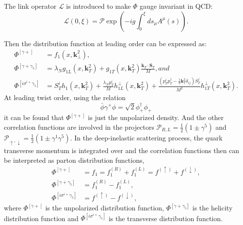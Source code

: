 The link operator $\mathcal{L}$ is introduced to make $\Phi$ gauge invariant in QCD:
\begin{equation}
\mathcal{L}(0,\xi)=\mathcal{P}\exp(-ig\int^{\xi}_0ds_\mu A^\mu(s)).
\end{equation}

Then the distribution function at leading order can be expressed as:
\begin{equation}
\begin{aligned}
       \Phi^{[\gamma+]}&=f_1(x,\boldsymbol{k}^2_{\perp}), \\
       \Phi^{[\gamma+\gamma_5]}&=\lambda_Ng_{1L}(x,\boldsymbol{k}_T^2)+ g_{1T}(x,\boldsymbol{k}_T^2)\frac{\boldsymbol{k}_T\cdot\boldsymbol{S}_T}{M}, and\\
       \Phi^{[i\sigma^{i+}\gamma_5]}&=S^i_Th_1(x,\boldsymbol{k}^2_T)+\frac{\lambda_Np^i_T}{M}h^{\perp}_{1L}(x,\boldsymbol{k}^2_T)+\frac{(p^i_Tp^j_T-\frac{1}{2}\boldsymbol{k}^2_T\delta_{ij})S^j_T}{M^2}h^{\perp}_{1T}(x,\boldsymbol{k}^2_T).
\end{aligned}
\label{eqn:phi4}
\end{equation}
At leading twist order, using the relation
\begin{equation}
  \bar{\phi}\gamma^+\phi=\sqrt{2}\phi^\dagger_+\phi_+
\end{equation}
it can be found that $\Phi^{[\gamma+]}$ is just the unpolarized density. And the other correlation functions are involved in the projectors $\mathcal{P}_{R,L}=\frac{1}{2}(1\pm\gamma^5)$ and $\mathcal{P}_{\uparrow,\downarrow}=\frac{1}{2}(1\pm\gamma^1\gamma^5)$. In the deep-inelastic scattering process, the quark transverse momentum is integrated over and the correlation functions then can be interpreted as parton distribution functions, \cite{CompleteTreeLevel}
\begin{equation}
\begin{aligned}
       \Phi^{[\gamma+]}&=f_1=f^{(R)}_1+f^{(L)}_1=f^{(\uparrow)}+f^{(\downarrow)}, \\
       \Phi^{[\gamma+\gamma_5]}&=f^{(R)}_1-f^{(L)}_1, \\
       \Phi^{[i\sigma^{i+}\gamma_5]}&=f^{(\uparrow)}-f^{(\downarrow)},
\end{aligned}
\label{eqn:phi5}
\end{equation}
where $\Phi^{[\gamma+]}$ is the unpolarized distribution function, $\Phi^{[\gamma+\gamma_5]}$ is the helicity distribution function and $\Phi^{[i\sigma^{i+}\gamma_5]}$ is the transverse distribution function.
